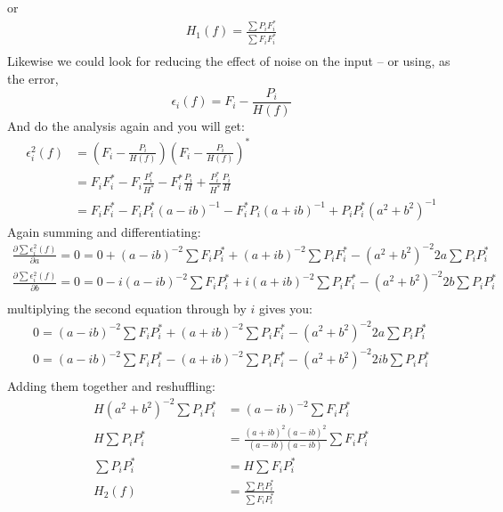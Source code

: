 \documentclass[11pt, oneside]{article}   	%
\begin{document}
or 
\begin{equation}
    \begin{split}
        H_1(f) = \frac{\sum P_iF^*_i}{\sum F_iF_i^*} \\
    \end{split}
\end{equation}
Likewise we could look for reducing the effect of noise on the input -- or using, as the error, 
\begin{equation}
\epsilon_i(f) = F_i - \frac{P_i}{H(f)}
\end{equation}
And do the analysis again and you will get:
\begin{equation}
    \begin{split}
        \epsilon_i^2(f) &= (F_i - \frac{P_i}{H(f)})(F_i - \frac{P_i}{H(f)})^*\\
        &= F_iF_i^* - F_i\frac{P_i^*}{H^*}- F^*_i\frac{P_i}{H}+\frac{P_i^*}{H^*}\frac{P_i}{H}\\
        &= F_iF_i^* - F_iP_i^*(a-ib)^{-1}- F^*_iP_i(a+ib)^{-1}+P_iP_i^*(a^2+b^2)^{-1}
    \end{split}
\end{equation}
Again summing and differentiating:
\begin{equation}
    \begin{split}
       \frac{\partial \sum \epsilon_i^2(f)}{\partial a} = 0= 0 +(a-ib)^{-2}\sum F_iP^*_i +(a+ib)^{-2}\sum P_iF^*_i -(a^2+b^2)^{-2}2a\sum P_iP_i^*\\
       \frac{\partial \sum \epsilon_i^2(f)}{\partial b} = 0= 0 -i(a-ib)^{-2}\sum F_iP^*_i +i(a+ib)^{-2}\sum P_iF^*_i -(a^2+b^2)^{-2}2b\sum P_iP_i^*\\
    \end{split}
\end{equation}
multiplying the second equation through by $i$ gives you:
\begin{equation}
    \begin{split}
       0= (a-ib)^{-2}\sum F_iP^*_i +(a+ib)^{-2}\sum P_iF^*_i -(a^2+b^2)^{-2}2a\sum P_iP_i^*\\
       0= (a-ib)^{-2}\sum F_iP^*_i -(a+ib)^{-2}\sum P_iF^*_i -(a^2+b^2)^{-2}2ib\sum P_iP_i^*\\
    \end{split}
\end{equation}
Adding them together and reshuffling:
\begin{equation}
    \begin{split}
       H(a^2+b^2)^{-2}\sum P_iP_i^*&= (a-ib)^{-2}\sum F_iP^*_i \\
       H\sum P_iP_i^*&= \frac{(a+ib)^2(a-ib)^2}{(a-ib)(a-ib)}\sum F_iP^*_i \\
       \sum P_iP_i^*&= H\sum F_iP^*_i \\
       H_2(f) &= \frac{\sum P_iP_i^*}{\sum F_iP^*_i} \\
    \end{split}
\end{equation}
\end{document}
